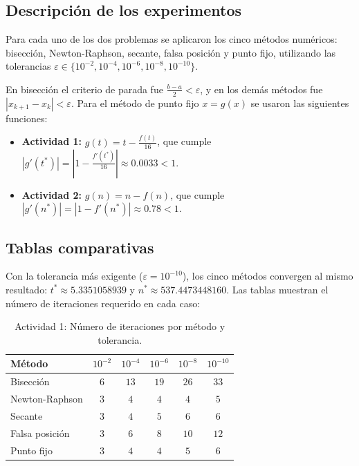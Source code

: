 \documentclass[11pt,a4paper]{article}
\begin{document}
\subsection{Descripción de los experimentos}
Para cada uno de los dos problemas se aplicaron los cinco métodos numéricos: bisección, Newton-Raphson, secante, falsa posición y punto fijo, utilizando las tolerancias $\varepsilon \in \{10^{-2}, 10^{-4}, 10^{-6}, 10^{-8}, 10^{-10}\}$.

En bisección el criterio de parada fue $\frac{b-a}{2} < \varepsilon$, y en los demás métodos fue $|x_{k+1} - x_k| < \varepsilon$. Para el método de punto fijo $x = g(x)$ se usaron las siguientes funciones:
\begin{itemize}[leftmargin=*]
    \item \textbf{Actividad 1:} $g(t) = t - \frac{f(t)}{16}$, que cumple $|g'(t^*)| = \left|1 - \frac{f'(t^*)}{16}\right| \approx 0.0033 < 1$.
    \item \textbf{Actividad 2:} $g(n) = n - f(n)$, que cumple $|g'(n^*)| = |1 - f'(n^*)| \approx 0.78 < 1$.
\end{itemize}

\subsection{Tablas comparativas}
Con la tolerancia más exigente ($\varepsilon = 10^{-10}$), los cinco métodos convergen al mismo resultado: $t^* \approx 5.3351058939$ y $n^* \approx 537.4473448160$. Las tablas muestran el número de iteraciones requerido en cada caso:

\begin{table}[h!]
    \centering
    \caption{Actividad 1: Número de iteraciones por método y tolerancia.}
    \label{tab:act1}
    \begin{tabular}{lccccc}
        \toprule
        Método & $10^{-2}$ & $10^{-4}$ & $10^{-6}$ & $10^{-8}$ & $10^{-10}$ \\
        \midrule
        Bisección       & $6$ & $13$ & $19$ & $26$ & $33$ \\
        Newton-Raphson  & $3$ & $4$  & $4$  & $4$  & $5$  \\
        Secante         & $3$ & $4$  & $5$  & $6$  & $6$  \\
        Falsa posición  & $3$ & $6$  & $8$  & $10$ & $12$ \\
        Punto fijo      & $3$ & $4$  & $4$  & $5$  & $6$  \\
        \bottomrule
    \end{tabular}
\end{table}
\end{document}
